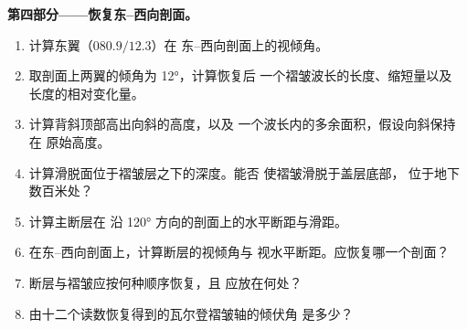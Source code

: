 \begin{problem}
\medskip\noindent\textbf{第四部分——恢复东–西向剖面。}
\begin{enumerate}[resume]
  \item 计算东翼（$080.9/12.3$）在
        东–西向剖面上的视倾角。
  \item 取剖面上两翼的倾角为 \ang{12}，计算恢复后
        一个褶皱波长的长度、缩短量以及
        长度的相对变化量。
  \item 计算背斜顶部高出向斜的高度，以及
        一个波长内的多余面积，假设向斜保持在
        原始高度。
  \item 计算滑脱面位于褶皱层之下的深度。能否
        使褶皱滑脱于盖层底部，
        位于地下数百米处？
  \item 计算主断层在
        沿 \ang{120} 方向的剖面上的水平断距与滑距。
  \item 在东–西向剖面上，计算断层的视倾角与
        视水平断距。应恢复哪一个剖面？
  \item 断层与褶皱应按何种顺序恢复，且
        应放在何处？
  \item 由十二个读数恢复得到的瓦尔登褶皱轴的倾伏角
        是多少？
\end{enumerate}
\end{problem}
